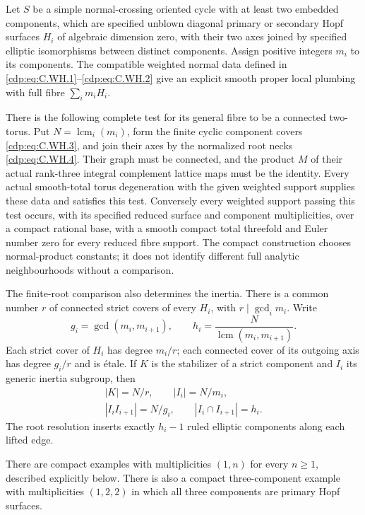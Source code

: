 
\begin{proposition}\label{cdp:st:C.2.UN.52}
Let $S$ be a simple normal-crossing oriented cycle
with at least two embedded components, which are specified unblown
diagonal primary or secondary Hopf surfaces $H_i$
of algebraic dimension zero, with their two axes
joined by specified elliptic isomorphisms between distinct components.
Assign positive integers $m_i$ to its components.
The compatible weighted normal data defined in
\eqref{cdp:eq:C.WH.1}--\eqref{cdp:eq:C.WH.2} give an explicit smooth proper
local plumbing with full fibre $\sum_i m_iH_i$.

There is the following complete test for its
general fibre to be a connected two-torus.
Put $N=\operatorname{lcm}_i(m_i)$, form the finite
cyclic component covers \eqref{cdp:eq:C.WH.3}, and join their
axes by the normalized root necks \eqref{cdp:eq:C.WH.4}.
Their graph must be connected, and the product
$M$ of their actual rank-three integral complement
lattice maps must be the identity. Every actual
smooth-total torus degeneration with the given
weighted support supplies these data and satisfies
this test. Conversely every weighted support
passing this test occurs, with its specified
reduced surface and component multiplicities,
over a compact rational base, with a smooth
compact total threefold and Euler number zero
for every reduced fibre support. The compact
construction chooses normal-product constants;
it does not identify different full analytic
neighbourhoods without a comparison.

The finite-root comparison also determines the
inertia. There is a common number $r$ of connected
strict covers of every $H_i$, with
$r\mid\gcd_i m_i$. Write
\[
 g_i=\gcd(m_i,m_{i+1}),\qquad
 h_i=\frac{N}{\operatorname{lcm}(m_i,m_{i+1})}.
\]
Each strict cover of $H_i$ has degree $m_i/r$;
each connected cover of its outgoing axis has
degree $g_i/r$ and is \'{e}tale. If $K$ is the
stabilizer of a strict component and $I_i$
its generic inertia subgroup, then
\[
 \begin{gathered}
 |K|=N/r,\qquad |I_i|=N/m_i,\\
 |I_iI_{i+1}|=N/g_i,\qquad
 |I_i\cap I_{i+1}|=h_i.
 \end{gathered}
\tag{C.WH.0}\label{cdp:eq:C.WH.0}
\]
The root resolution inserts exactly $h_i-1$
ruled elliptic components along each lifted edge.

There are compact examples with multiplicities
$(1,n)$ for every $n\ge1$, described explicitly
below. There is also a compact three-component
example with multiplicities $(1,2,2)$ in which
all three components are primary Hopf surfaces.
\end{proposition}

